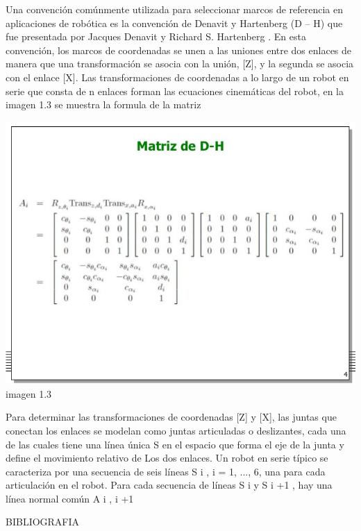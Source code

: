 \documentclass[10pt,a4paper]{article}
\begin{document}
\begin{center}
\large \huge Una convención comúnmente utilizada para seleccionar marcos de referencia en aplicaciones de robótica es la convención de Denavit y Hartenberg (D – H) que fue presentada por Jacques Denavit y Richard S. Hartenberg . En esta convención, los marcos de coordenadas se unen a las uniones entre dos enlaces de manera que una transformación se asocia con la unión, [Z], y la segunda se asocia con el enlace [X]. Las transformaciones de coordenadas a lo largo de un robot en serie que consta de n enlaces forman las ecuaciones cinemáticas del robot, en la imagen 1.3 se muestra la formula de la matriz
\end{center}

\begin{center}\includegraphics[scale=0.6]{imagenes/matriz.jpg}\\imagen 1.3
\end{center}
\begin{center}
\large \huge
 {Para determinar las transformaciones de coordenadas [Z] y [X], las juntas que conectan los enlaces se modelan como juntas articuladas o deslizantes, cada una de las cuales tiene una línea única S en el espacio que forma el eje de la junta y define el movimiento relativo de Los dos enlaces. Un robot en serie típico se caracteriza por una secuencia de seis líneas S i , i  = 1, ..., 6, una para cada articulación en el robot. Para cada secuencia de líneas S i y S i +1 , hay una línea normal común A i , i +1}\cite{santos2006reported}
\end{center}

\vspace{7cm}
 BIBLIOGRAFIA
\cite{santos2006reported}


\end{document}
